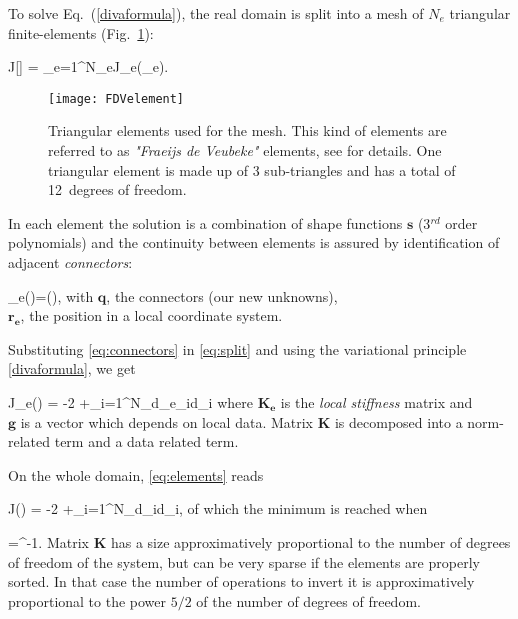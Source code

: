 To solve Eq.~(\ref{divaformula}), the real domain is split into a mesh of $N_e$ triangular finite-elements (Fig.~\ref{fig:FDVelement}):

\be
J[\varphi] = \sum_{e=1}^{N_{e}}J_{e}(\varphi_{e}).
\label{eq:split}
\ee

\begin{figure}[htpb]
	\centering
	\parbox{.6\textwidth}{
		\texttt{[image: FDVelement]}
		}\parbox{.4\textwidth}{
		\caption[Triangular elements used for the mesh.]{Triangular elements used for the mesh. This kind of elements are referred to as \emph{"Fraeijs de Veubeke"} elements, see \citet{BRASSEUR94} for details. One triangular element is made up of 3 sub-triangles and has a total of  12~degrees of freedom.\label{fig:FDVelement}}}
\end{figure}

In each element the solution is a combination of shape functions $\mathbf{s}$ (3$^{rd}$ order polynomials) and the continuity between elements is assured by identification of adjacent \textit{connectors}:

\be
\varphi_{e}()=(),
\label{eq:connectors}
\ee
with $\mathbf{q}$, the connectors (our new unknowns),\\
\hphantom{with} $\mathbf{r_e}$, the position in a local coordinate system.

Substituting \eqref{eq:connectors} in \eqref{eq:split} and using the variational principle \eqref{divaformula}, we get

\be
J_{e}() = -2 +\sum_{i=1}^{N_{d_{e}}}\mu_{i}d_{i}
\label{eq:elements}
\ee
where $\mathbf{K_e}$ is the \textit{local stiffness} matrix and\\
\hphantom{where} $\mathbf{g}$ is a vector which depends on local data. Matrix $\mathbf{K}$ is decomposed into a norm-related term and a data related term.

On the whole domain, \eqref{eq:elements} reads

\be
J() = -2 +\sum_{i=1}^{N_{d}}\mu_{i}d_{i},
\label{eq:domain}
\ee
of which the minimum is reached when

\be
{}=^{-1}.
\label{eq:solution}
\ee
Matrix $\mathbf{K}$ has a size approximatively proportional to the number of degrees of freedom of the system, but can be very sparse if the elements are properly sorted. In that case the number of operations to invert it is approximatively proportional to the power $5/2$ of the number of degrees of freedom.

